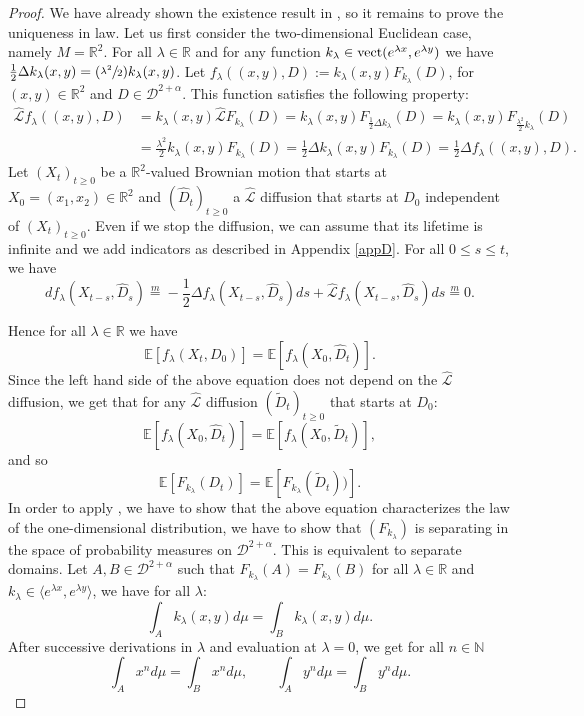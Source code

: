 \documentclass[10pt]{amsart}
\newcommand{\Psfrac}[2]{(\sfrac{#1}{#2})}
\theoremstyle{plain}
\theoremstyle{definition}
\newcommand{\EE}{{\mathbb E}}
\newcommand{\SL}{{\mathscr L}}
\let\a\alpha
\let\D\Delta
\newcommand{\cD}{\mathcal{D}}
\begin{document}
\begin{proof}
We have already shown the existence result in \cite{zbMATH07470497}, so it remains to prove the uniqueness in law.
Let us first consider the two-dimensional Euclidean case, namely $M = \mathbb{R}^2 $. For all $ \lambda \in \mathbb{R}$	 and for any function $k_{\lambda} \in {\rm vect} ( e^{\lambda x},e^{\lambda y} ) $ we have $ \frac12 \D k_{\lambda}(x,y)= \Psfrac{\lambda^2}{2}k_{\lambda}(x,y)$. Let $f_{\lambda} ((x,y),D):= k_{\lambda}(x,y) F_{k_{\lambda}}(D) $, for $(x,y) \in \mathbb{R}^2$ and $ D \in \cD^{2+\alpha} $. This function satisfies the following property:
\begin{align*}
\widehat{\SL} f_{\lambda}((x,y),D) & = k_{\lambda}(x,y) \widehat{\SL} F_{k_{\lambda}}(D) = k_{\lambda}(x,y) F_{\frac12 \D k_{\lambda}}(D)= k_{\lambda}(x,y) F_{\frac{\lambda^2}{2} k_{\lambda}}(D) \\
&= \frac{\lambda^2}{2} k_{\lambda}(x,y) F_{k_{\lambda}}(D) = \frac12 \D k_{\lambda}( x,y) F_{k_{\lambda}}(D)= \frac12 \D f_{\lambda}((x,y),D).
\end{align*}
Let $ (X_t)_{t \ge 0}$ be a $\mathbb{R}^2$-valued Brownian motion that starts at $X_0= (x_1,x_2) \in \mathbb{R}^2$ and $(\hat{D}_t)_{t \ge 0}$ a $\widehat{\SL} $ diffusion that starts at $D_0$ independent of $(X_t)_{t \ge 0}$.
{Even if we stop the diffusion, we can assume that its lifetime is infinite and we add indicators as described in Appendix \ref{appD}.}
For all $ 0 \le s \le t $, we have
\[
df_{\lambda}(X_{t-s}, \hat{D}_s) \overset{m} {=} - \frac{1}{2} \D f_{\lambda}(X_{t-s},\hat{D}_s)ds + \widehat{\SL} f_{\lambda} (X_{t-s},\hat{D}_s)ds \overset{m} {=} 0.
\]

Hence for all $\lambda \in \mathbb{R} $ we have
\begin{equation}\label{passe-passe}
\EE[f_{\lambda}(X_{t}, D_0) ] = \EE[f_{\lambda}(X_{0}, \hat{D}_t) ].
\end{equation}
Since the left hand side of the above equation does not depend on the $\widehat{\SL} $ diffusion, we get that for any $\widehat{\SL} $ diffusion $(\tilde{D}_t)_{t \ge 0}$ that starts at $D_0$:
\[
\EE[f_{\lambda}(X_{0}, \hat{D}_t) ] = \EE[f_{\lambda}(X_{0}, \tilde{D}_t) ],
\]
and so
\[
\EE[ F_{k_{\lambda}}(D_{t})] = \EE[ F_{k_{\lambda}}( \tilde{D}_{t}))].
\]
In order to apply \cite[Th.\,4.2]{MR838085}, we have to show that the above equation characterizes the law of the one-dimensional distribution, \ie we have to show that $ ( F_{k_{\lambda}}) $ is separating in the space of probability measures on $\cD^{2+\a} $. This is equivalent to separate domains.
Let $ A, B \in \cD^{2+\a}$ such that $ F_{k_{\lambda}}(A)= F_{k_{\lambda}}(B) $ for all $\lambda \in \mathbb{R} $ and $k_{\lambda} \in \langle e^{\lambda x},e^{\lambda y} \rangle $, we have for all $ \lambda$:
\[
\int_A k_{\lambda}(x,y) d\mu = \int_B k_{\lambda}(x,y) d\mu.
\]
After successive derivations in $ \lambda$ and evaluation at $\lambda =0 $, we get for all $n \in \mathbb{N}$
\[
\int_A x^n d\mu = \int_B x^n d\mu,\qquad
\int_A y^n d\mu = \int_B y^n d\mu.
\]


\end{proof}
\end{document}
